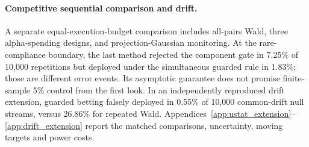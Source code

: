 \paragraph{Competitive sequential comparison and drift.}
A separate equal-execution-budget comparison includes all-pairs Wald,
three alpha-spending designs, and projection-Gaussian monitoring.
At the rare-compliance boundary, the last method rejected the component
gate in 7.25\% of 10,000 repetitions but deployed under the simultaneous
guarded rule in 1.83\%; those are different error events. Its asymptotic
guarantee does not promise finite-sample 5\% control from the first look.
In an independently reproduced drift extension, guarded betting falsely
deployed in 0.55\% of 10,000 common-drift null streams, versus 26.86\%
for repeated Wald. Appendices~\ref{app:ustat_extension}--\ref{app:drift_extension}
report the matched comparisons, uncertainty, moving targets and power costs.
